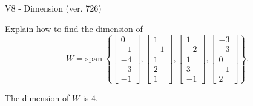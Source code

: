 \begin{exercise}
  \begin{exerciseTitle}V8 - Dimension (ver. 726)\end{exerciseTitle}
  \begin{exerciseStatement}
    Explain how to find the dimension of 
\[W=\mathrm{span}\ \left\{\left[\begin{array}{r}
0 \\
-1 \\
-4 \\
-3 \\
-1
\end{array}\right] , \left[\begin{array}{r}
1 \\
-1 \\
1 \\
2 \\
1
\end{array}\right] , \left[\begin{array}{r}
1 \\
-2 \\
1 \\
3 \\
-1
\end{array}\right] , \left[\begin{array}{r}
-3 \\
-3 \\
0 \\
-1 \\
2
\end{array}\right]\right\}.\]



  \end{exerciseStatement}
  \begin{exerciseAnswer}
   The dimension of \(W\) is  \(4\).
  


  \end{exerciseAnswer}
\end{exercise}